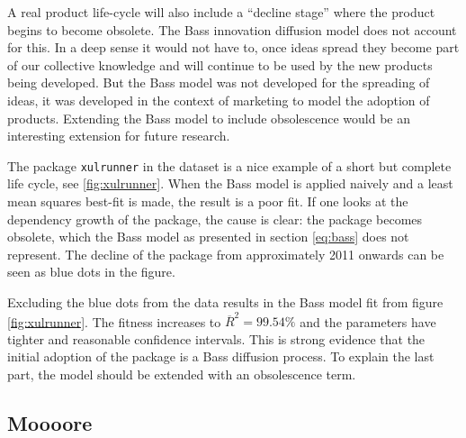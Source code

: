 \documentclass[smallextended,final]{svjour3}
\begin{document}
A real product life-cycle will also include a ``decline stage'' where the product begins to become obsolete. The Bass innovation diffusion model does not account for this. In a deep sense it would not have to, once ideas spread they become part of our collective knowledge and will continue to be used by the new products being developed. But the Bass model was not developed for the spreading of ideas, it was developed in the context of marketing to model the adoption of products. Extending the Bass model to include obsolescence would be an interesting extension for future research.

The package \verb|xulrunner| in the dataset is a nice example of a short but complete life cycle, see \ref{fig:xulrunner}. When the Bass model is applied naively and a least mean squares best-fit is made, the result is a poor fit. If one looks at the dependency growth of the package, the cause is clear: the package becomes obsolete, which the Bass model as presented in section \ref{eq:bass} does not represent. The decline of the package from approximately 2011 onwards can be seen as blue dots in the figure.

Excluding the blue dots from the data results in the Bass model fit from figure \ref{fig:xulrunner}. The fitness increases to $\overline{R}^2 =99.54\%$ and the parameters have tighter and reasonable confidence intervals. This is strong evidence that the initial adoption of the package is a Bass diffusion process. To explain the last part, the model should be extended with an obsolescence term. 


\subsection{Moooore}
\end{document}
